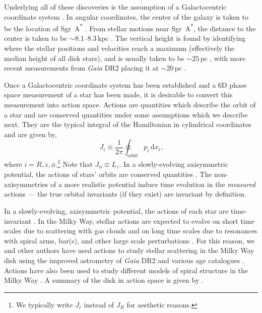 \documentclass[twocolumn]{aastex62}
\newcommand{\pc}{\text{pc}}
\newcommand{\kpc}{\text{kpc}}
\newcommand{\beq}{\begin{equation}}
\newcommand{\eeq}{\end{equation}}
\begin{document}
Underlying all of these discoveries is the assumption of a Galactocentric
coordinate system \citep{2008gady.book.....B}. In angular
coordinates, the center of the galaxy is taken to be the location of
Sgr~A\textsuperscript{*} \citep[e.g.][]{2004ApJ...616..872R}. From stellar
motions near Sgr~A\textsuperscript{*}, the distance to the center is taken to
be $\sim 8.1\text{--}8.3\,\kpc$
\citep{2009ApJ...692.1075G,2018AA...615L..15G}. The vertical height is found
by identifying where the stellar positions and velocities reach a maximum
(effectively the median height of all disk stars), and is usually taken to be
$\sim 25\,\pc$ \citep{2001ApJ...553..184C}, with more recent measurements from
{\em Gaia} DR2 placing it at $\sim 20\,\pc$ \citep{2019MNRAS.482.1417B}.

Once a Galactocentric coordinate system has been established and a 6D phase
space measurement of a star has been made, it is desirable to convert this
measurement into action space. Actions are quantities which describe the orbit
of a star and are conserved quantities under some assumptions which we
describe next. They are the typical integral of the Hamiltonian in cylindrical
coordinates and are given by,
\beq\label{eq:actions}
J_i \equiv
\frac{1}{2\pi} \oint_{\text{orbit}}p_i\,\text{d}x_i\text{,}
\eeq
where $i=R,z,\phi$.\footnote{We typically write $J_r$ instead of $J_R$ for
aesthetic reasons.} Note that $J_{\phi} \equiv L_z$. In a slowly-evolving
axisymmetric potential, the actions of stars' orbits are conserved quantities
\citep{2008gady.book.....B,2014RvMP...86....1S}. The non-axisymmetries of a
more realistic potential induce time evolution in the {\em measured} actions
--- the true orbital invariants (if they exist) are invariant by definition.

In a slowly-evolving, axisymmetric potential, the actions of each star are
time-invariant \citep{2008gady.book.....B}. In the Milky Way, stellar actions
are expected to evolve on short time scales due to scattering with gas clouds
and on long time scales due to resonances with spiral arms, bar(s), and other
large scale perturbations \citep{2014RvMP...86....1S}. For this reason, we and
other authors have used actions to study stellar scattering in the Milky Way
disk using the improved astrometry of {\em Gaia} DR2 and various age
catalogues \citep{2018ApJ...867...31B,2018arXiv180803278T}. Actions have also
been used to study different models of spiral structure in the Milky Way
\citep{2019MNRAS.tmp..155S}. A summary of the disk in action space is given by
\citet{2018arXiv180503653T}.
\end{document}
